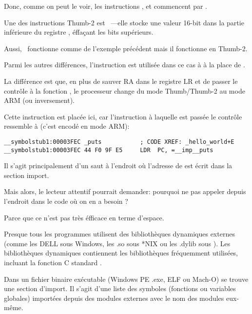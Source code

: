 
Donc, comme on peut le voir, les instructions ,  et 
commencent par .

Une des instructions Thumb-2 est  ~---elle stocke une valeur
16-bit dans la partie inférieure du registre , éffaçant les bits supérieurs.

Aussi,  ~fonctionne comme  de l'exemple précédent
mais il fonctionne en Thumb-2.


Parmi les autres différences, l'instruction  est utilisée dans ce cas à
à la place de .

La différence est que, en plus de sauver \ac{RA} dans le registre \ac{LR} et de
passer le contrôle à la fonction \puts, le processeur change du mode Thumb/Thumb-2
au mode ARM (ou inversement).

Cette instruction est placée ici, car l'instruction à laquelle est passée le contrôle
ressemble à (c'est encodé en mode ARM):

\begin{lstlisting}[style=customasmARM]
__symbolstub1:00003FEC _puts           ; CODE XREF: _hello_world+E
__symbolstub1:00003FEC 44 F0 9F E5     LDR  PC, =__imp__puts
\end{lstlisting}

Il s'agit principalement d'un saut à l'endroit où l'adresse de \puts est écrit
dans la section import.

Mais alors, le lecteur attentif pourrait demander: pourquoi ne pas appeler \puts
depuis l'endroit dans le code où on en a besoin ?

Parce que ce n'est pas très éfficace en terme d'espace.

Presque tous les programmes utilisent des bibliothèques dynamiques externes
(comme les DELL sous Windows, les .so sous *NIX ou les .dylib sous \MacOSX).
Les bibliothèques dynamiques contiennent les bibliothèques fréquemment utilisées,
incluant la fonction C standard \puts.

Dans un fichier binaire exécutable (Windows PE .exe, ELF ou Mach-O) se trouve
une section d'import.
Il s'agit d'une liste des symboles (fonctions ou variables globales) importées
depuis des modules externes avec le nom des modules eux-même.

